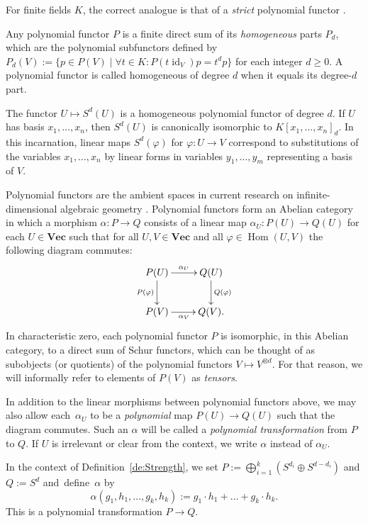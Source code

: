 \documentclass{amsart}
\theoremstyle{plain}
\theoremstyle{definition}
\DeclareMathOperator{\id}{id}
\renewcommand{\phi}{\varphi}
\DeclareMathOperator{\Hom}{Hom}
\renewcommand{\Vec}{\mathbf{Vec}}
\begin{document}
\begin{re}
For finite fields $K$, the correct analogue is that of a
{\em strict} polynomial functor \cite{FS:cohomfingroup}.
\end{re}

Any polynomial functor $P$ is a finite direct sum of its {\em homogeneous}
parts $P_d$, which are the polynomial subfunctors defined by
$P_d(V):=\{p \in P(V) \mid \forall t \in K: P(t \id_V)p=t^d p\}$ for each integer
$d\geq0$. A polynomial functor is called homogeneous of degree $d$ when
it equals its degree-$d$ part.

\begin{ex}
The functor $U \mapsto S^d(U)$ is a homogeneous polynomial functor of degree $d$. If $U$ has basis $x_1,\ldots,x_n$, then
$S^d(U)$ is canonically isomorphic to $K[x_1,\ldots,x_n]_d$. In this
incarnation, linear maps $S^d(\phi)$ for $\phi\colon U \to V$ correspond to
substitutions of the variables $x_1,\ldots,x_n$ by linear forms in
variables $y_1,\ldots,y_m$ representing a basis of $V$.
\end{ex}

Polynomial functors are the ambient spaces in current research on
infinite-di\-men\-sional algebraic geometry \cite{B:thesis,BDE:boundedstrength,
BDES:geometrypolyrep,D:topnoeth}. Polynomial functors
form an Abelian category in which a morphism $\alpha\colon P \to Q$ consists
of a linear map $\alpha_U\colon P(U) \to Q(U)$ for each $U \in \Vec$ such that
for all $U,V\in\Vec$ and all $\phi \in \Hom(U,V)$ the following diagram commutes:
\[ \xymatrix{
P(U) \ar[r]^{\alpha_U} \ar[d]_{P(\phi)} & Q(U) \ar[d]^{Q(\phi)} \\
P(V) \ar[r]_{\alpha_V} & Q(V).
} \]
In characteristic zero, each polynomial functor $P$ is isomorphic, in this
Abelian category, to a direct sum of Schur functors, which can be thought
of as subobjects (or quotients) of the polynomial functors $V \mapsto
V^{\otimes d}$. For that reason, we will informally refer to elements
of $P(V)$ as {\em tensors}.

In addition to the linear morphisms between polynomial functors above,
we may also allow each~$\alpha_U$ to be a {\em polynomial} map $P(U)\to Q(U)$ such that
the diagram commutes. Such an $\alpha$ will be called a {\em polynomial
transformation} from $P$ to $Q$. If $U$ is irrelevant or clear from the
context, we write $\alpha$ instead of $\alpha_U$.

\begin{ex} \label{ex:Strength}
In the context of Definition~\ref{de:Strength}, we set $P:=\bigoplus_{i=1}^k
(S^{d_i} \oplus S^{d-d_i})$ and $Q:=S^d$ and~define~$\alpha$ by
\[
\alpha(g_1,h_1,\ldots,g_k,h_k):=g_1\cdot h_1 + \ldots + g_k\cdot h_k.
\]
This is a polynomial transformation $P \to Q$.
\end{ex}
\end{document}
